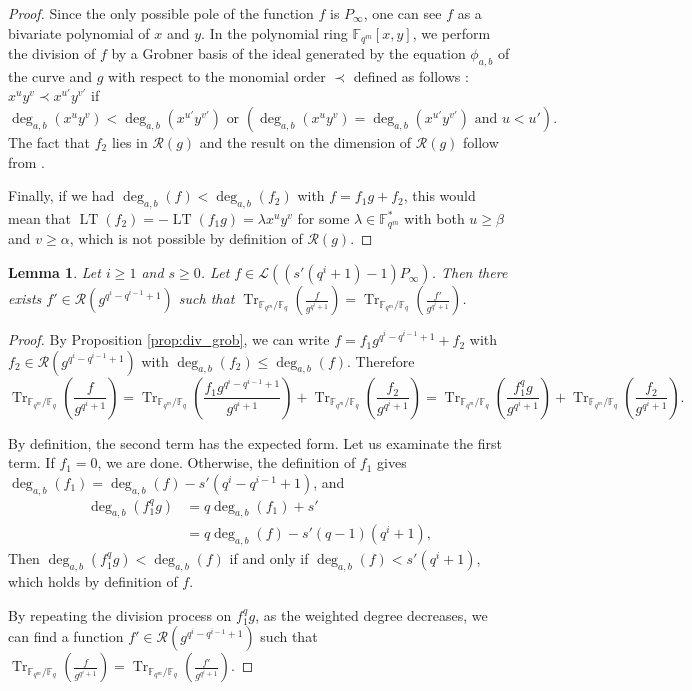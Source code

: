 \documentclass[a4paper]{article}
\newtheorem{lemma}[thm]{Lemma}
\theoremstyle{definition}
\theoremstyle{remark}
\newcommand{\calL}{\mathcal{L}}
\newcommand{\calR}{\mathcal{R}}
\newcommand{\fq}{\mathbb{F}_{q}}
\newcommand{\F}{\mathbb{F}}
\newcommand{\Tr}[1]{\operatorname{Tr}_{\mathbb{F}_{q^m}/\fq}\left(#1\right)}
\newcommand{\LT}[1]{\operatorname{LT}\left(#1\right)}
\newcommand{\degab}[1]{\deg_{a,b}\left(#1\right)}
\begin{document}
\begin{proof}
		Since the only possible pole of the function $f$ is $P_\infty$, one can see $f$ as a bivariate polynomial of $x$ and $y$. In the polynomial ring $\F_{q^m}[x,y]$, we perform the division of $f$ by a Grobner basis of the ideal generated by the equation $\phi_{a,b}$ of the curve and $g$ with respect to the monomial order $\prec$ defined as follows : $x^uy^v \prec x^{u'}y^{v'}$ if
	\[ \degab{x^uy^v} < \degab{x^{u'}y^{v'}} \text{ or } \left(\degab{x^uy^v} = \degab{x^{u'}y^{v'}}  \text{ and } u < u'\right).\]
	The fact that $f_2$ lies in $\calR(g)$ and the result on the dimension of $\calR(g)$ follow from \cite[Proposition 4]{GH00}.
	
	Finally, if we had $\degab{f} < \degab{f_2}$ with $f=f_1 g +f_2$, this would mean that $\LT{f_2}=-\LT{f_1 g}=\lambda x^uy^v$ for some $\lambda \in \F_{q^m}^*$ with both $u \geq \beta$ and $v \geq \alpha$, which is not possible by definition of $\calR\left(g\right)$.
\end{proof}


\begin{lemma} \label{lem:weighted_division}
	Let $i \geq 1$ and $s \geq 0$. Let $f \in \calL\left(\left(s'(q^i+1)-1\right)P_\infty\right)$. Then there exists $f' \in \calR\left(g^{q^i-q^{i-1}+1}\right)$ such that $\Tr{\frac{f}{g^{q^i+1}}} = \Tr{\frac{f'}{g^{q^i+1}}} $.
\end{lemma}

\begin{proof}

By Proposition \ref{prop:div_grob}, we can write $f=f_1 g^{q^i-q^{i-1}+1} +f_2$ with
	$f_2 \in \calR\left(g^{q^i-q^{i-1}+1}\right)$ with $\degab{f_2} \leq \degab{f}$. Therefore
	\[\Tr{\frac{f}{g^{q^i+1}}}=\Tr{\frac{f_1 g^{q^i-q^{i-1}+1}}{g^{q^i+1}}} +\Tr{\frac{f_2}{g^{q^i+1}}}= \Tr{\frac{f_1^qg}{g^{q^i+1}}} +\Tr{\frac{f_2}{g^{q^i+1}}}. \]
	
	By definition, the second term has the expected form. Let us examinate the first term. If $f_1=0$, we are done. Otherwise, the definition of $f_1$ gives
$\degab{f_1} =\degab{f} - s'(q^i-q^{i-1}+1)$, and
	\begin{align*}
	\degab{f_1^qg} 	&= q \degab{f_1} + s'\\
					&= q\degab{f} - s'(q-1)(q^i+1) ,
	\end{align*} 
Then  $\degab{f_1^qg} < \degab{f}$ if and only if $\degab{f} < s'(q^i+1)$, which holds by definition of $f$.

By repeating the division process on $f_1^qg$, as the weighted degree decreases, we can find a function $f' \in \calR\left(g^{q^i-q^{i-1}+1}\right)$ such that $\Tr{\frac{f}{g^{q^i+1}}} = \Tr{\frac{f'}{g^{q^i+1}}} $.

\end{proof}
\end{document}
